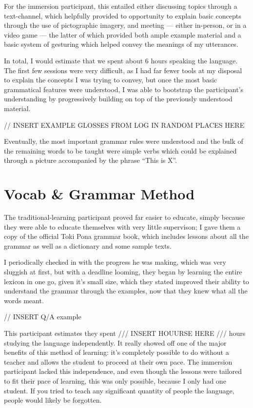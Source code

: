 \documentclass[a4paper,10pt]{article}
\begin{document}
For the immersion participant, this entailed either discussing topics through a text-channel, which
helpfully provided to opportunity to explain basic concepts through the use of pictographic imagery,
and meeting --- either in-person, or in a video game --- the latter of which provided both ample
example material and a basic system of gesturing which helped convey the meanings of my utterances.

In total, I would estimate that we spent about 6 hours speaking the language. The first few sessions
were very difficult, as I had far fewer tools at my disposal to explain the concepts I was trying to
convey, but once the most basic grammatical features were understood, I was able to bootstrap the
participant's understanding by progressively building on top of the previously understood material.

// INSERT EXAMPLE GLOSSES FROM LOG IN RANDOM PLACES HERE

Eventually, the most important grammar rules were understood and the bulk of the remaining words to
be taught were simple verbs which could be explained through a picture accompanied by the phrase
``This is X''.


\section{Vocab \& Grammar Method}
The traditional-learning participant proved far easier to educate, simply because they were able to
educate themselves with very little supervison; I gave them a copy of the official Toki Pona grammar
book, which includes lessons about all the grammar as well as a dictionary and some sample texts.

I periodically checked in with the progress he was making, which was very sluggish at first, but with
a deadline looming, they began by learning the entire lexicon in one go, given it's small size, which
they stated improved their ability to understand the grammar through the examples, now that they knew
what all the words meant.

// INSERT Q/A example

This participant estimates they spent /// INSERT HOUURSE HERE /// hours studying the language
independently. It really showed off one of the major benefits of this method of learning: it's
completely possible to do without a teacher and allows the student to proceed at their own pace.
The immersion participant lacked this independence, and even though the lessons were tailored to fit
their pace of learning, this was only possible, because I only had one student. If you tried to teach
any significant quantity of people the language, people would likely be forgotten.
\end{document}
